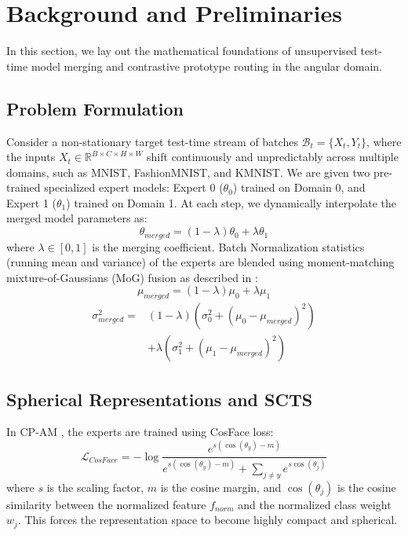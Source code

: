 \documentclass{article}
\theoremstyle{plain}
\theoremstyle{definition}
\theoremstyle{remark}
\begin{document}
\section{Background and Preliminaries}
\label{prelim}
In this section, we lay out the mathematical foundations of unsupervised test-time model merging and contrastive prototype routing in the angular domain.

\subsection{Problem Formulation}
Consider a non-stationary target test-time stream of batches $\mathcal{B}_t = \{X_t, Y_t\}$, where the inputs $X_t \in \mathbb{R}^{B \times C \times H \times W}$ shift continuously and unpredictably across multiple domains, such as MNIST, FashionMNIST, and KMNIST. We are given two pre-trained specialized expert models: Expert 0 ($\theta_0$) trained on Domain 0, and Expert 1 ($\theta_1$) trained on Domain 1. At each step, we dynamically interpolate the merged model parameters as:
\begin{equation}
    \theta_{merged} = (1 - \lambda) \theta_0 + \lambda \theta_1
\end{equation}
where $\lambda \in [0, 1]$ is the merging coefficient. Batch Normalization statistics (running mean and variance) of the experts are blended using moment-matching mixture-of-Gaussians (MoG) fusion as described in \cite{bkcomerge2026}:
\begin{equation}
    \mu_{merged} = (1 - \lambda) \mu_0 + \lambda \mu_1
\end{equation}
\begin{align}
    \sigma^2_{merged} = &(1 - \lambda)(\sigma^2_0 + (\mu_0 - \mu_{merged})^2) \nonumber \\
    &+ \lambda(\sigma^2_1 + (\mu_1 - \mu_{merged})^2)
\end{align}

\subsection{Spherical Representations and SCTS}
In CP-AM \cite{cpam2026}, the experts are trained using CosFace loss:
\begin{equation}
    \mathcal{L}_{CosFace} = -\log \frac{e^{s(\cos(\theta_{y}) - m)}}{e^{s(\cos(\theta_{y}) - m)} + \sum_{j \neq y} e^{s \cos(\theta_j)}}
\end{equation}
where $s$ is the scaling factor, $m$ is the cosine margin, and $\cos(\theta_j)$ is the cosine similarity between the normalized feature $f_{norm}$ and the normalized class weight $w_j$. This forces the representation space to become highly compact and spherical.
\end{document}

